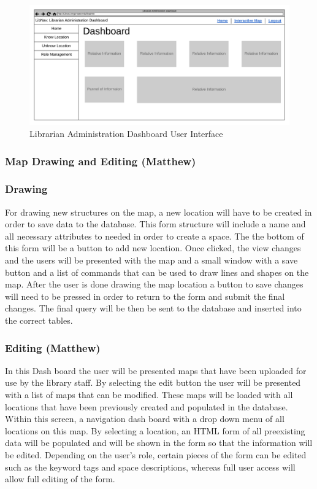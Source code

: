 \documentclass[letterpaper,10pt,titlepage, onecolumn, compsoc]{IEEEtran}
\begin{document}
\begin{figure}[h!]
\centering
\includegraphics[scale=.45\textwidth,natwidth=4050,natheight=1868]{images/librarian-administration-dashboard.png}
\caption{Librarian Administration Dashboard User Interface}
\label{fig:method}
\end{figure}

\subsubsection{Map Drawing and Editing (Matthew)}
\subsubsection{Drawing}
For drawing new structures on the map, a new location will have to be created in order to save data to the database. This form structure will include a name and all necessary attributes to needed in order to create a space. The the bottom of this form will be a button to add new location. Once clicked, the view changes and the users will be presented with the map and a small window with a save button and a list of commands that can be used to draw lines and shapes on the map. After the user is done drawing the map location a button to save changes will need to be pressed in order to return to the form and submit the final changes. The final query will be then be sent to the database and inserted into the correct tables.

\subsubsection{Editing (Matthew)} 
In this Dash board the user will be presented maps that have been uploaded for use by the library staff. By selecting the edit button the user will be presented with a list of maps that can be modified. These maps will be loaded with all locations that have been previously created and populated in the database. Within this screen, a navigation dash board with a drop down menu of all locations on this map. By selecting a location, an HTML form of all preexisting data will be populated and will be shown in the form so that the information will be edited. Depending on the user’s role, certain pieces of the form can be edited such as the keyword tags and space descriptions, whereas full user access will allow full editing of the form. 
\end{document}
